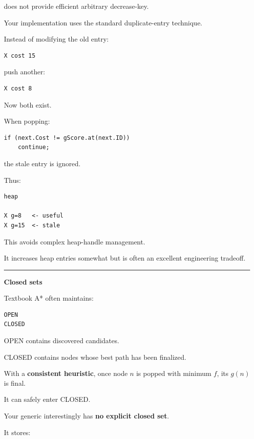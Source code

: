  does not provide efficient arbitrary decrease-key.

Your implementation uses the standard duplicate-entry technique.

Instead of modifying the old entry:

\begin{verbatim}
X cost 15
\end{verbatim}

push another:

\begin{verbatim}
X cost 8
\end{verbatim}

Now both exist.

When popping:

\begin{verbatim}
if (next.Cost != gScore.at(next.ID))
    continue;
\end{verbatim}

the stale entry is ignored.

Thus:

\begin{verbatim}
heap

X g=8   <- useful
X g=15  <- stale
\end{verbatim}

This avoids complex heap-handle management.

It increases heap entries somewhat but is often an excellent engineering tradeoff.

\begin{center}\rule{0.5\linewidth}{0.5pt}\end{center}

\textbf{Closed sets}

Textbook A* often maintains:

\begin{verbatim}
OPEN
CLOSED
\end{verbatim}

OPEN contains discovered candidates.

CLOSED contains nodes whose best path has been finalized.

With a \textbf{consistent heuristic}, once node \(n\) is popped with minimum \(f\), its \(g(n)\) is final.

It can safely enter CLOSED.

Your generic  interestingly has \textbf{no explicit closed set}.

It stores:

